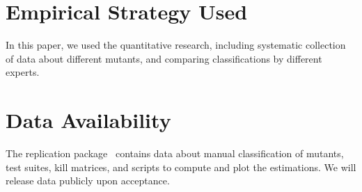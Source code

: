 \documentclass[sigconf,review,anonymous]{acmart}
\newcounter{todocounter}
\newcommand{\todo}[1]{\marginpar{$|$}\textcolor{red}{\stepcounter{todocounter}\footnote[\thetodocounter]{\textcolor{red}{\textbf{TODO }}\textit{#1}}}}
\renewcommand{\todo}[1]{}
\begin{document}
\section{Empirical Strategy Used}
In this paper, we used the quantitative research, including systematic
collection of data about different mutants, and comparing classifications by
different experts.\todo{TODO}


\section{Data Availability}
The replication package~\cite{replication-package} contains data about manual
classification of mutants, test suites, kill matrices, and scripts
to compute and plot the estimations.
We will release data publicly upon acceptance.
\end{document}
